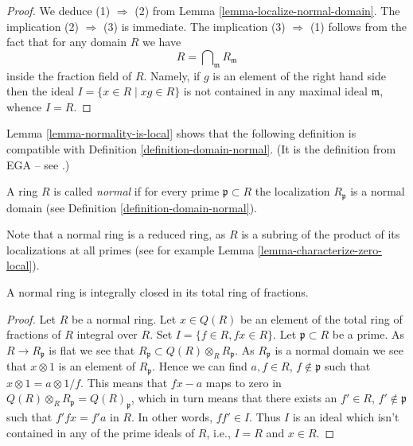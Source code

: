 \begin{proof}
We deduce (1) $\Rightarrow$ (2) from Lemma \ref{lemma-localize-normal-domain}.
The implication (2) $\Rightarrow$ (3) is immediate. The implication
(3) $\Rightarrow$ (1) follows from the fact that for any domain $R$ we have
$$
R = \bigcap\nolimits_{\mathfrak m} R_{\mathfrak m}
$$
inside the fraction field of $R$. Namely, if $g$ is an element of
the right hand side then the ideal $I = \{x \in R \mid xg \in R\}$
is not contained in any maximal ideal $\mathfrak m$, whence $I = R$.
\end{proof}

\noindent
Lemma \ref{lemma-normality-is-local} shows that the following definition
is compatible with Definition \ref{definition-domain-normal}. (It is the
definition from EGA -- see \cite[IV, 5.13.5 and 0, 4.1.4]{EGA}.)

\begin{definition}
\label{definition-ring-normal}
A ring $R$ is called {\it normal} if for every prime
$\mathfrak p \subset R$ the localization $R_{\mathfrak p}$ is
a normal domain (see Definition \ref{definition-domain-normal}).
\end{definition}

\noindent
Note that a normal ring is a reduced ring, as $R$ is a subring of the product
of its localizations at all primes (see for example
Lemma \ref{lemma-characterize-zero-local}).

\begin{lemma}
\label{lemma-normal-ring-integrally-closed}
A normal ring is integrally closed in its total ring of fractions.
\end{lemma}

\begin{proof}
Let $R$ be a normal ring. Let $x \in Q(R)$ be an element of the total ring
of fractions of $R$ integral over $R$. Set $I = \{f \in R, fx \in R\}$. Let
$\mathfrak p \subset R$ be a prime. As $R \to R_{\mathfrak p}$ is
flat we see that $R_{\mathfrak p} \subset Q(R) \otimes_R R_{\mathfrak p}$. As
$R_{\mathfrak p}$ is a normal domain we see that $x \otimes 1$ is an element of
$R_{\mathfrak p}$. Hence we can find $a, f \in R$, $f \not \in \mathfrak p$
such that $x \otimes 1 = a \otimes 1/f$. This means that $fx - a$ maps to
zero in $Q(R) \otimes_R R_{\mathfrak p} = Q(R)_{\mathfrak p}$, which
in turn means that there exists an $f' \in R$, $f' \not \in \mathfrak p$
such that $f'fx = f'a$ in $R$. In other words, $ff' \in I$. Thus $I$
is an ideal which isn't contained in any of the prime ideals of $R$, i.e.,
$I = R$ and $x \in R$.
\end{proof}

